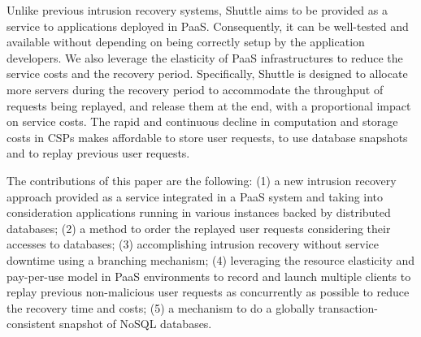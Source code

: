 Unlike previous intrusion recovery systems, Shuttle aims to be provided as a service to applications deployed in \ac{PaaS}. Consequently, it can be well-tested and available without depending on being correctly setup by the application developers. We also leverage the elasticity of \ac{PaaS} infrastructures to reduce the service costs and the recovery period. Specifically, Shuttle is designed to allocate more servers during the recovery period to accommodate the throughput of requests being replayed, and release them at the end, with a proportional impact on service costs. The rapid and continuous decline in computation and storage costs in CSPs makes affordable to store user requests, to use database snapshots and to replay previous user requests.

The contributions of this paper are the following: 
(1) a new intrusion recovery approach provided as a service integrated in a \ac{PaaS} system and taking into consideration applications running in various instances backed by distributed databases;
(2) a method to order the replayed user requests considering their accesses to databases;
(3) accomplishing intrusion recovery without service downtime using a branching mechanism;
(4) leveraging the resource elasticity and pay-per-use model in \ac{PaaS} environments to record and launch multiple clients to replay previous non-malicious user requests as concurrently as possible to reduce the recovery time and costs;
(5) a mechanism to do a globally transaction-consistent snapshot of NoSQL databases.

